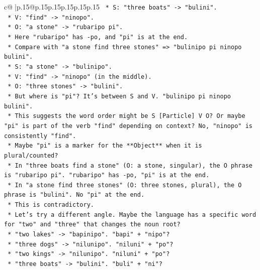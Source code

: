 \documentclass{article}
\begin{document}
{\begin{supertabular}{c@{$\;$}|p{.15\linewidth}@{}p{.15\linewidth}p{.15\linewidth}p{.15\linewidth}p{.15\linewidth}p{.15\linewidth}}
{{{\texttt{                        *   S: "three boats" {-}> "bulini".} \\
\texttt{                        *   V: "find" {-}> "ninopo".} \\
\texttt{                        *   O: "a stone" {-}> "rubaripo pi".} \\
\texttt{                        *   Here "rubaripo" has {-}po, and "pi" is at the end.} \\
\texttt{                    *   Compare with "a stone find three stones" => "bulinipo pi ninopo bulini".} \\
\texttt{                        *   S: "a stone" {-}> "bulinipo".} \\
\texttt{                        *   V: "find" {-}> "ninopo" (in the middle).} \\
\texttt{                        *   O: "three stones" {-}> "bulini".} \\
\texttt{                        *   But where is "pi"? It's between S and V. "bulinipo pi ninopo bulini".} \\
\texttt{                        *   This suggests the word order might be S {[}Particle{]} V O? Or maybe "pi" is part of the verb "find" depending on context? No, "ninopo" is consistently "find".} \\
\texttt{                        *   Maybe "pi" is a marker for the **Object** when it is plural/counted?} \\
\texttt{                            *   In "three boats find a stone" (O: a stone, singular), the O phrase is "rubaripo pi". "rubaripo" has {-}po, "pi" is at the end.} \\
\texttt{                            *   In "a stone find three stones" (O: three stones, plural), the O phrase is "bulini". No "pi" at the end.} \\
\texttt{                            *   This is contradictory.} \\
\texttt{    *   Let's try a different angle. Maybe the language has a specific word for "two" and "three" that changes the noun root?} \\
\texttt{        *   "two lakes" {-}> "bapinipo". "bapi" + "nipo"?} \\
\texttt{        *   "three dogs" {-}> "nilunipo". "niluni" + "po"?} \\
\texttt{        *   "two kings" {-}> "nilunipo". "niluni" + "po"?} \\
\texttt{        *   "three boats" {-}> "bulini". "buli" + "ni"?} \\
}}}
\end{supertabular}}
\end{document}
